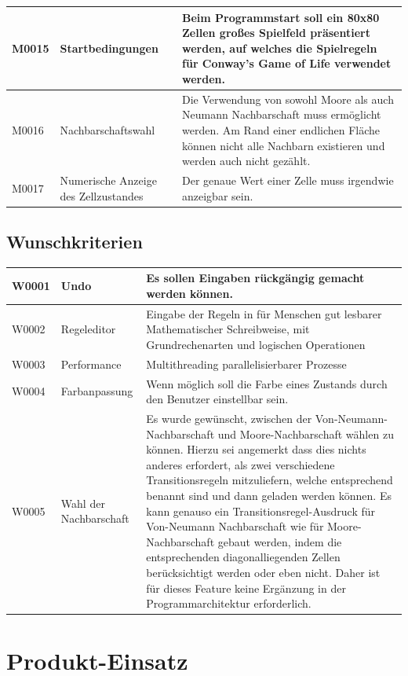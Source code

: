 \documentclass[11pt,a4paper]{article}
\begin{document}
\begin{longtable}[m]{|m{2.2cm}|m{4cm}|m{8cm}|}
\hline
M0015 & Startbedingungen & Beim Programmstart soll ein 80x80 Zellen großes Spielfeld präsentiert werden, auf welches die Spielregeln für Conway's Game of Life verwendet werden. \\

\hline
M0016 & Nachbarschaftswahl & Die Verwendung von sowohl Moore als auch Neumann Nachbarschaft muss ermöglicht werden. Am Rand einer endlichen Fläche können nicht alle Nachbarn existieren und werden auch nicht gezählt. \\

\hline
M0017 & Numerische Anzeige des Zellzustandes & Der genaue Wert einer Zelle muss irgendwie anzeigbar sein. \\
\hline
\end{longtable}    
\newpage

\subsection{Wunschkriterien}
\begin{longtable}[m]{|m{2.2cm}|m{4cm}|m{8cm}|}
\hline
W0001 & Undo & Es sollen Eingaben rückgängig gemacht werden können.\\
\hline
W0002 & Regeleditor & Eingabe der Regeln in für Menschen gut lesbarer Mathematischer Schreibweise, mit Grundrechenarten und logischen Operationen\\
\hline
W0003 & Performance & Multithreading parallelisierbarer Prozesse\\
\hline
W0004 &Farbanpassung & Wenn möglich soll die Farbe eines Zustands durch den Benutzer einstellbar sein.\\
\hline
W0005 & Wahl der Nachbarschaft & Es wurde gewünscht, zwischen der Von-Neumann-Nachbarschaft und Moore-Nachbarschaft wählen zu können. Hierzu sei angemerkt dass dies nichts anderes erfordert, als zwei verschiedene Transitionsregeln mitzuliefern, welche entsprechend benannt sind und dann geladen werden können. Es kann genauso ein Transitionsregel-Ausdruck für Von-Neumann Nachbarschaft wie für Moore-Nachbarschaft gebaut werden, indem die entsprechenden diagonalliegenden Zellen berücksichtigt werden oder eben nicht. Daher ist für dieses Feature keine Ergänzung in der Programmarchitektur erforderlich.\\
\hline
\end{longtable}

\pagebreak
\section{Produkt-Einsatz}
\end{document}
